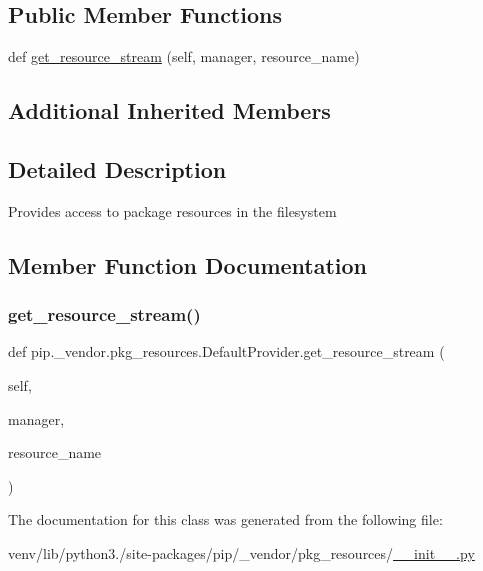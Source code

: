 \subsection*{Public Member Functions}
\begin{DoxyCompactItemize}
\item 
def \hyperlink{classpip_1_1__vendor_1_1pkg__resources_1_1DefaultProvider_a83a0dc2dbe82045fcb0788f6e79de1d5}{get\+\_\+resource\+\_\+stream} (self, manager, resource\+\_\+name)
\end{DoxyCompactItemize}
\subsection*{Additional Inherited Members}


\subsection{Detailed Description}
\begin{DoxyVerb}Provides access to package resources in the filesystem\end{DoxyVerb}
 

\subsection{Member Function Documentation}
\mbox{\label{classpip_1_1__vendor_1_1pkg__resources_1_1DefaultProvider_a83a0dc2dbe82045fcb0788f6e79de1d5}} 
\subsubsection{\texorpdfstring{get\+\_\+resource\+\_\+stream()}{get\_resource\_stream()}}
{\footnotesize\ttfamily def pip.\+\_\+vendor.\+pkg\+\_\+resources.\+Default\+Provider.\+get\+\_\+resource\+\_\+stream (\begin{DoxyParamCaption}\item[{}]{self,  }\item[{}]{manager,  }\item[{}]{resource\+\_\+name }\end{DoxyParamCaption})}



The documentation for this class was generated from the following file\+:\begin{DoxyCompactItemize}
\item 
venv/lib/python3./site-\/packages/pip/\+\_\+vendor/pkg\+\_\+resources/\hyperlink{venv_2lib_2python3_89_2site-packages_2pip_2__vendor_2pkg__resources_2____init_____8py}{\+\_\+\+\_\+init\+\_\+\+\_\+.\+py}\end{DoxyCompactItemize}
